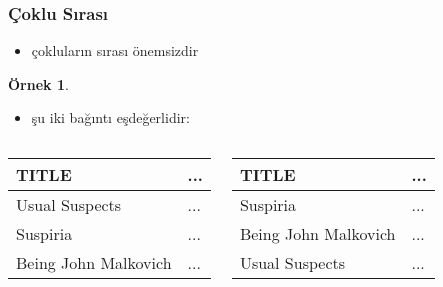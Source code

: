 \documentclass[dvipsnames]{beamer}
\theoremstyle{definition}
\theoremstyle{example}
\newtheorem{ornek}[theorem]{Örnek}
\theoremstyle{plain}
\begin{document}
\begin{frame}
  \frametitle{Çoklu Sırası}

  \begin{itemize}
    \item çokluların sırası önemsizdir
  \end{itemize}

  \pause
  \begin{ornek}
    \begin{itemize}
      \item şu iki bağıntı eşdeğerlidir:
    \end{itemize}

    \begin{columns}
      \begin{tiny}
      \begin{table}
        \begin{tabular}{|l|l|}\hline
TITLE                & ...\\\hline\hline
Usual Suspects       & ...\\\hline
Suspiria             & ...\\\hline
Being John Malkovich & ...\\\hline
        \end{tabular}
      \end{table}
      \end{tiny}

      \begin{tiny}
      \begin{table}
        \begin{tabular}{|l|l|}\hline
TITLE                & ...\\\hline\hline
Suspiria             & ...\\\hline
Being John Malkovich & ...\\\hline
Usual Suspects       & ...\\\hline
        \end{tabular}
      \end{table}
      \end{tiny}
    \end{columns}
  \end{ornek}
\end{frame}
\end{document}
